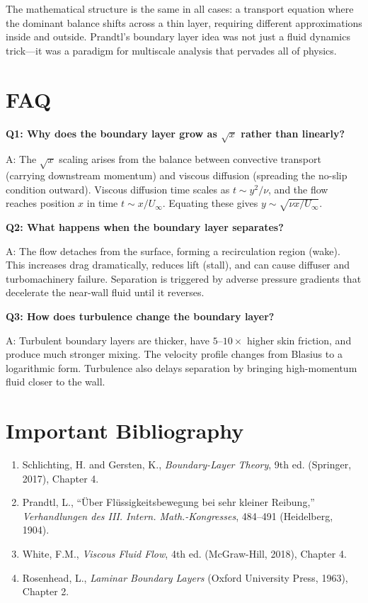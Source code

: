 The mathematical structure is the same in all cases: a transport equation where the dominant balance shifts across a thin layer, requiring different approximations inside and outside. Prandtl's boundary layer idea was not just a fluid dynamics trick---it was a paradigm for multiscale analysis that pervades all of physics.


\section*{FAQ}

\textbf{Q1: Why does the boundary layer grow as $\sqrt{x}$ rather than linearly?}

A: The $\sqrt{x}$ scaling arises from the balance between convective transport (carrying downstream momentum) and viscous diffusion (spreading the no-slip condition outward). Viscous diffusion time scales as $t \sim y^2/\nu$, and the flow reaches position $x$ in time $t \sim x/U_\infty$. Equating these gives $y \sim \sqrt{\nu x / U_\infty}$.

\textbf{Q2: What happens when the boundary layer separates?}

A: The flow detaches from the surface, forming a recirculation region (wake). This increases drag dramatically, reduces lift (stall), and can cause diffuser and turbomachinery failure. Separation is triggered by adverse pressure gradients that decelerate the near-wall fluid until it reverses.

\textbf{Q3: How does turbulence change the boundary layer?}

A: Turbulent boundary layers are thicker, have $5$--$10\times$ higher skin friction, and produce much stronger mixing. The velocity profile changes from Blasius to a logarithmic form. Turbulence also delays separation by bringing high-momentum fluid closer to the wall.
\section*{Important Bibliography}

\begin{enumerate}
\item Schlichting, H. and Gersten, K., \textit{Boundary-Layer Theory}, 9th ed. (Springer, 2017), Chapter 4.
\item Prandtl, L., ``\"Uber Fl\"ussigkeitsbewegung bei sehr kleiner Reibung,'' \textit{Verhandlungen des III. Intern. Math.-Kongresses}, 484--491 (Heidelberg, 1904).
\item White, F.M., \textit{Viscous Fluid Flow}, 4th ed. (McGraw-Hill, 2018), Chapter 4.
\item Rosenhead, L., \textit{Laminar Boundary Layers} (Oxford University Press, 1963), Chapter 2.
\end{enumerate}

